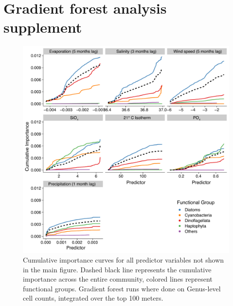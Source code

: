 \documentclass[draft]{agujournal2019}
\begin{document}
\newpage
\section{Gradient forest analysis supplement}


\begin{figure}[h!]
\noindent\includegraphics[width=\textwidth]{fig/FigureA2_GF_output_Supplement_v1.pdf}
\caption{Cumulative importance curves for all predictor variables not shown in the main figure. Dashed black line represents the cumulative importance across the entire community, colored lines represent functional groups. Gradient forest runs where done on Genus-level cell counts, integrated over the top 100 meters.}
\label{fig:sup:GFoutput_lags_extra}
\end{figure}
\end{document}
